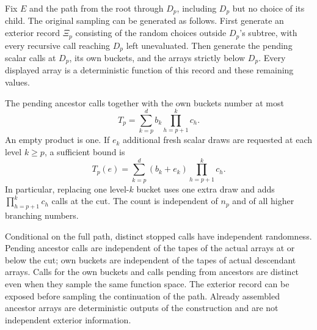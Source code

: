 \begin{lemma}\label{lem:stopped-calls}
Fix $E$ and the path from the root through $D_p$, including $D_p$ but no
choice of its child.  The original sampling can be generated as follows.
First generate an exterior record $\Xi_p$ consisting of the random choices
outside $D_p$'s subtree, with every recursive call reaching $D_p$ left
unevaluated.  Then generate the pending scalar calls at $D_p$, its own
buckets, and the arrays strictly below $D_p$.  Every displayed array is a
deterministic function of this record and these remaining values.

The pending ancestor calls together with the own buckets number at most
\begin{equation}\label{eq:stopped-count}
 T_p=\sum_{k=p}^d b_k\prod_{h=p+1}^k c_h.
\end{equation}
An empty product is one.  If $e_k$ additional fresh scalar draws are requested
at each level $k\ge p$, a sufficient bound is
\begin{equation}\label{eq:stopped-extra-count}
 T_p(e)=\sum_{k=p}^d(b_k+e_k)\prod_{h=p+1}^k c_h.
\end{equation}
In particular, replacing one level-$k$ bucket uses one extra draw and adds
$\prod_{h=p+1}^k c_h$ calls at the cut.  The count is independent of $n_p$ and
of all higher branching numbers.

Conditional on the full path, distinct stopped calls have independent
randomness.  Pending ancestor calls are independent of the tapes of the
actual arrays at or below the cut; own buckets are independent of the tapes
of actual descendant arrays.  Calls for the own buckets and calls pending
from ancestors are distinct even
when they sample the same function space.  The exterior record can be exposed
before sampling the continuation of the path.  Already assembled ancestor
arrays are deterministic outputs of the construction and are not independent
exterior information.
\end{lemma}

